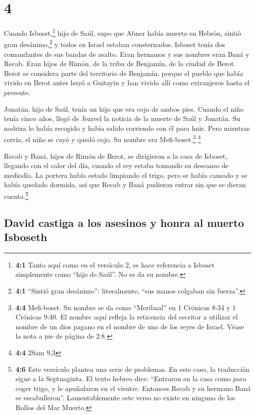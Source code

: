\hypertarget{section-3}{%
\section{4}\label{section-3}}

 Cuando Isboset,\footnote{\textbf{4:1} Tanto aquí como en
  el versículo 2, se hace referencia a Isboset simplemente como ``hijo
  de Saúl''. No se da su nombre.} hijo de Saúl, supo que Abner había
muerto en Hebrón, sintió gran desánimo,\footnote{\textbf{4:1} ``Sintió
  gran desánimo'': literalmente, ``sus manos colgaban sin fuerza''.} y
todos en Israel estaban consternados.  Isboset tenía dos
comandantes de sus bandas de asalto. Eran hermanos y sus nombres eran
Baná y Recab. Eran hijos de Rimón, de la tribu de Benjamín, de la ciudad
de Berot. Berot se considera parte del territorio de Benjamín,
 porque el pueblo que había vivido en Berot antes huyó a
Guitayin y han vivido allí como extranjeros hasta el presente.

 Jonatán, hijo de Saúl, tenía un hijo que era cojo de
ambos pies. Cuando el niño tenía cinco años, llegó de Jezreel la noticia
de la muerte de Saúl y Jonatán. Su nodriza lo había recogido y había
salido corriendo con él para huir. Pero mientras corría, el niño se cayó
y quedó cojo. Su nombre era Mefi-boset.\footnote{\textbf{4:4}
  Mefi-boset. Su nombre se da como ``Meribaal'' en 1 Crónicas 8:34 y 1
  Crónicas 9:40. El nombre aquí refleja la reticencia del escritor a
  utilizar el nombre de un dios pagano en el nombre de uno de los reyes
  de Israel. Véase la nota a pie de página de 2:8.} \footnote{\textbf{4:4}
  2Sam 9,3}

 Recab y Baná, hijos de Rimón de Berot, se dirigieron a la
casa de Isboset, llegando con el calor del día, cuando el rey estaba
tomando su descanso de mediodía.  La portera había estado
limpiando el trigo, pero se había cansado y se había quedado dormida,
así que Recab y Baná pudieron entrar sin que se dieran
cuenta.\footnote{\textbf{4:6} Este versículo plantea una serie de
  problemas. En este caso, la traducción sigue a la Septuaginta. El
  texto hebreo dice: ``Entraron en la casa como para coger trigo, y le
  apuñalaron en el vientre. Entonces Recab y su hermano Baná se
  escabulleron''. Lamentablemente este verso no existe en ninguno de los
  Rollos del Mar Muerto.}

\hypertarget{david-castiga-a-los-asesinos-y-honra-al-muerto-isboseth}{%
\subsection{David castiga a los asesinos y honra al muerto
Isboseth}\label{david-castiga-a-los-asesinos-y-honra-al-muerto-isboseth}}

